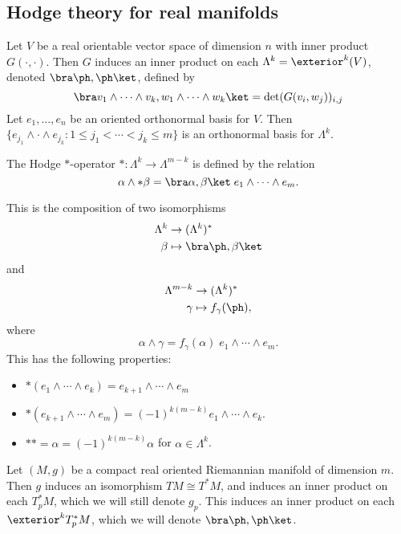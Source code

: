 \documentclass[a4paper]{article}
\begin{document}
\subsection{Hodge theory for real manifolds}
Let $V$ be a real orientable vector space of dimension $n$ with inner product $G(\cdot, \cdot)$. Then $G$ induces an inner product on each $\Lambda^k = \exterior^k (V)$, denoted $\bra \ph, \ph\ket$, defined by
\[
  \bra v_1 \wedge \cdots \wedge v_k, w_1 \wedge \cdots \wedge w_k\ket = \det (G(v_i, w_j))_{i, j}
\]
Let $e_1, \ldots, e_n$ be an oriented orthonormal basis for $V$. Then $\{e_{j_1} \wedge \cdot \wedge e_{j_k} : 1 \leq j_1 < \cdots < j_k \leq m\}$ is an orthonormal basis for $\Lambda^k$.
\begin{defi}
  The Hodge $*$-operator \index{$*$}$*: \Lambda^k \to \Lambda^{m - k}$ is defined by the relation
  \[
    \alpha \wedge *\beta = \bra \alpha, \beta\ket\; e_1 \wedge \cdots \wedge e_m.
  \]
\end{defi}
This is the composition of two isomorphisms
\begin{align*}
  \Lambda^k & \to (\Lambda^k)^*\\
  \beta &\mapsto \bra \ph, \beta \ket
\end{align*}
and
\begin{align*}
  \Lambda^{m - k} &\to (\Lambda^k)^*\\
  \gamma &\mapsto f_\gamma(\ph),
\end{align*}
where
\[
  \alpha \wedge \gamma = f_\gamma(\alpha) \; e_1 \wedge \cdots \wedge e_m.
\]
This has the following properties:
\begin{prop}\leavevmode
  \begin{itemize}
    \item $*(e_1 \wedge \cdots \wedge e_k) = e_{k + 1} \wedge \cdots \wedge e_m$
    \item $*(e_{k + 1} \wedge \cdots \wedge e_m) = (-1)^{k(m - k)} e_1 \wedge \cdots \wedge e_k$.
    \item $** =\alpha = (-1)^{k(m - k)}\alpha$ for $\alpha \in \Lambda^k$.\fakeqed
  \end{itemize}
\end{prop}
Let $(M, g)$ be a compact real oriented Riemannian manifold of dimension $m$. Then $g$ induces an isomorphism $TM \cong T^*M$, and induces an inner product on each $T_p^* M$, which we will still denote $g_p$. This induces an inner product on each $\exterior^k T_p^*M$, which we will denote $\bra \ph, \ph \ket$.
\end{document}
